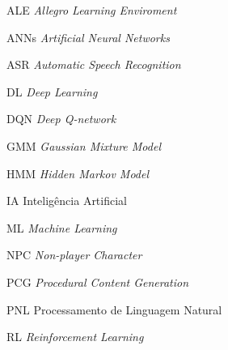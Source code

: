 \begin{siglas}
 \item[ALE] \textit{Allegro Learning Enviroment}
 \item[ANNs] \textit{Artificial Neural Networks}
 \item[ASR] \textit{Automatic Speech Recognition}
 \item[DL] \textit{Deep Learning}
 \item[DQN] \textit{Deep Q-network}
 \item[GMM] \textit{Gaussian Mixture Model}
 \item[HMM] \textit{Hidden Markov Model}
 \item[IA] Inteligência Artificial
 \item[ML] \textit{Machine Learning}
 \item[NPC] \textit{Non-player Character}
 \item[PCG] \textit{Procedural Content Generation}
 \item[PNL] Processamento de Linguagem Natural
 \item[RL] \textit{Reinforcement Learning}
\end{siglas}
